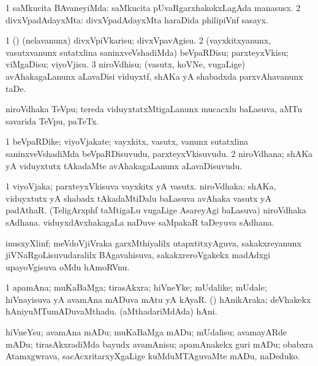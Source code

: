 \bentry
{}
\gl{\kirxvi}
\bmng
\bnum
\num{1} saMkucita BAvaneyiMda:  saMkucita pUvaRgarxhakokxLagAda manasusx. 
\num{2} divxVpadAdayxMta:  divxVpadAdayxMta haraDida philipiVnf sasayx. 
\enum
\emng
\eentry

\bentry
{}
\gl{\sakirx}
\bmng
\bnum
\num{1} (\pArxparx) (nelavanunx) divxVpiVkarisu; divxVpavAgisu. 
\num{2} (vayxkitxyanunx, vasutxvanunx sutatxlina saninxveVshadiMda) beVpaRDisu; parxteyxVkisu; viMgaDisu; viyoVjisu. 
\num{3} niroVdhisu; (vasutx, koVNe, \mo vugaLige) avAhakagaLanunx aLavaDisi viduyxtf, shAKa yA shabadxda parxvAhavanunx taDe. 
\enum
\emng
\eentry

\bentry
{}
\gl{\nA}
\bmng
niroVdhaka TeVpu; tereda viduyxtatxMtigaLanunx mucacxlu baLasuva, aMTu savarida TeVpu, paTeTx. 
\emng
\eentry

\bentry
{}
\gl{\nA}
\bmng
\bnum
\num{1} beVpaRDike; viyoVjakate; vayxkitx, vasutx, \mo vanunx sutatxlina saninxveVshadiMda beVpaRDisuvudu, parxteyxVkisuvudu. 
\num{2} niroVdhana; shAKa yA viduyxtutx tAkadaMte avAhakagaLanunx aLavaDisuvudu. 
\enum
\emng
\eentry

\bentry
{}
\gl{\nA}
\bmng
\bnum
\num{1} viyoVjaka; parxteyxVkisuva vayxkitx yA vasutx. 
 niroVdhaka: 
\banum
{} shAKa, viduyxtutx yA shabadx tAkadaMtiDalu baLasuva avAhaka vasutx yA padAthaR. 
 (TeligArxphf taMtigaLu \mo vugaLige AsareyAgi baLasuva) niroVdhaka sAdhana. 
 viduyxdAvxhakagaLa naDuve saMpakaR taDeyuva sAdhana. 
\eanum
\numie
\enum
\emng
\eentry

\bentry
{}
\gl{\nA}
\bmng
inusxyXlinf; meVdoVjiVraka garxMthiyalilx utapxtitxyAguva, sakakxreyanunx jiVNaRgoLisuvudaralilx BAgavahisuva, sakakxreroVgakekx madAdxgi upayoVgisuva oMdu hAmoRVnu. 
\emng
\eentry

\bentry
{}
\gl{\nA}
\bmng
\bnum
\num{1} apamAna; muKaBaMga; tirasAkxra; hiVneYke; mUdalike; mUdale; hiVnayisuva yA avamAna mADuva mAtu yA kAyaR. 
 (\veYshA) 
\banum
{} hAnikAraka; deVhakekx hAniyuMTumADuvaMthadu. 
 (aMthadariMdAda) hAni. 
\eanum
\numie
\enum
\emng
\eentry

\bentry
{}
\gl{\sakirx}
\bmng
hiVneYsu; avamAna mADu; muKaBaMga mADu; mUdalisu; avamayARde mADu; tirasAkxradiMda bayudx avamAnisu; apamAnakekx guri mADu; obabxra Atamxgwrava, sacAcxritarxyXgaLige kuMduMTAguvaMte mADu, naDeduko. 
\emng
\eentry

